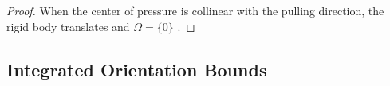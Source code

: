 \documentclass[conference]{IEEEtran}
\begin{document}
\begin{proof}
  When the center of pressure is collinear with the pulling direction,
  the rigid body translates and $\Omega = \{0\}$ \cite{Mason}.
\end{proof}

\subsection{Integrated Orientation Bounds}\label{sec:orientation-bounds}
\end{document}
